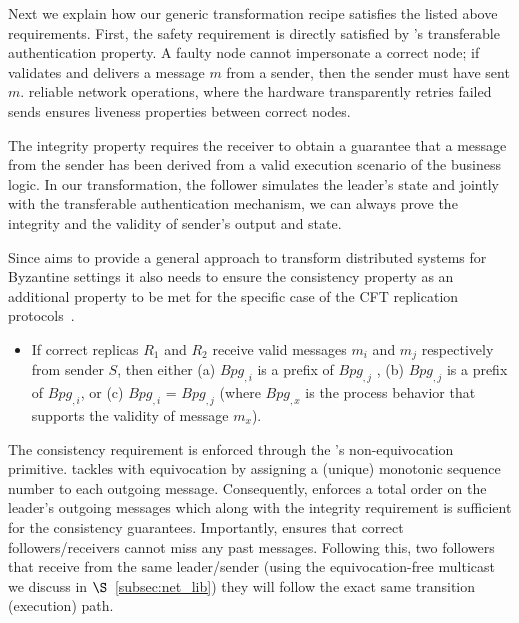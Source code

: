  Next we explain how our generic transformation recipe satisfies the listed above requirements. First, the safety requirement is directly satisfied by \projecttitle{}'s transferable authentication property. A faulty node cannot impersonate a correct node; if \projecttitle{} validates and delivers a message $m$ from a sender, then the sender must have sent $m$. \projecttitle{} reliable network operations, where the \projecttitle{} hardware transparently retries failed sends ensures liveness properties between correct nodes. 

The integrity property requires the receiver to obtain a guarantee that a message from the sender has been derived from a valid execution scenario of the business logic. In our transformation, the follower simulates the leader's state and jointly with the transferable authentication mechanism, we can always prove the integrity and the validity of sender's output and state. %


 Since \projecttitle{} aims to provide a general approach to transform distributed systems for Byzantine settings it also needs to ensure the consistency property as an additional property to be met for the specific case of the CFT replication protocols~\cite{clement2012}.
\begin{itemize}
\item {} If correct replicas $R_1$ and $R_2$ receive valid messages $m_i$ and $m_j$  respectively from sender $S$, then either (a) $Bpg_{,i}$ is a prefix of $Bpg_{,j}$ , (b) $Bpg_{,j}$ is a prefix of $Bpg_{,i}$, or (c) $Bpg_{,i}$ = $Bpg_{,j}$ (where $Bpg_{,x}$ is the process behavior that supports the validity of message $m_x$).
\end{itemize}

The consistency requirement is enforced through the \projecttitle{}'s non-equivocation primitive. \projecttitle{} tackles with equivocation by assigning  a (unique) monotonic sequence number to each outgoing message. Consequently, \projecttitle{} enforces a total order on the leader's outgoing messages which along with the integrity requirement is sufficient for the consistency guarantees. Importantly, \projecttitle{} ensures that correct followers/receivers cannot miss any past messages. Following this, two followers that receive from the same leader/sender (using the equivocation-free multicast we discuss in $\S$~\ref{subsec:net_lib}) they will follow the exact same transition (execution) path. %



